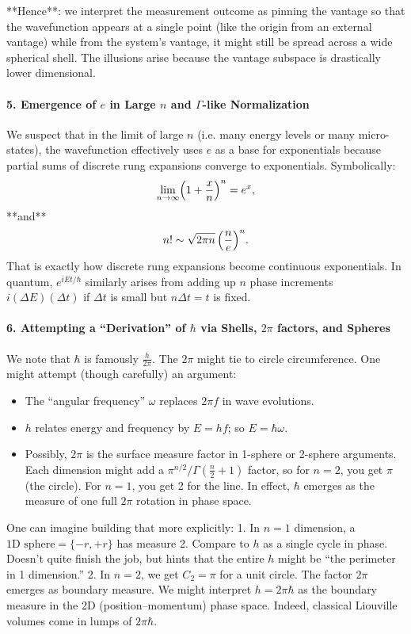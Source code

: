 \documentclass{article}
\begin{document}
**Hence**: we interpret the measurement outcome as pinning the vantage so that the wavefunction appears at a single point (like the origin from an external vantage) while from the system’s vantage, it might still be spread across a wide spherical shell. The illusions arise because the vantage subspace is drastically lower dimensional.

\paragraph{5. Emergence of $e$ in Large $n$ and $\Gamma$-like Normalization}

We suspect that in the limit of large $n$ (i.e. many energy levels or many micro-states), the wavefunction effectively uses $e$ as a base for exponentials because partial sums of discrete rung expansions converge to exponentials. Symbolically:
\begin{equation}
\lim_{n\to\infty} \Bigl(1+\frac{x}{n}\Bigr)^n = e^x,
\end{equation}
**and**
\begin{equation}
 n! \sim \sqrt{2\pi n}\,\Bigl(\frac{n}{e}\Bigr)^n.
\end{equation}
That is exactly how discrete rung expansions become continuous exponentials. In quantum, $e^{iEt/\hbar}$ similarly arises from adding up $n$ phase increments $i(\Delta E)(\Delta t)$ if $\Delta t$ is small but $n\Delta t = t$ is fixed.

\paragraph{6. Attempting a “Derivation” of $\hbar$ via Shells, $2\pi$ factors, and Spheres}

We note that $\hbar$ is famously $\frac{h}{2\pi}$. The $2\pi$ might tie to circle circumference. One might attempt (though carefully) an argument:
\begin{itemize}
\item The “angular frequency” $\omega$ replaces $2\pi f$ in wave evolutions.
\item $h$ relates energy and frequency by $E=h f$; so $E=\hbar\omega.$
\item Possibly, $2\pi$ is the surface measure factor in 1-sphere or 2-sphere arguments. Each dimension might add a $\pi^{n/2}/\Gamma(\tfrac{n}{2}+1)$ factor, so for $n=2$, you get $\pi$ (the circle). For $n=1$, you get 2 for the line. In effect, $\hbar$ emerges as the measure of one full $2\pi$ rotation in phase space.
\end{itemize}
One can imagine building that more explicitly:
1. In $n=1$ dimension, a $\text{1D sphere}=\{-r,+r\}$ has measure 2. Compare to $h$ as a single cycle in phase. Doesn’t quite finish the job, but hints that the entire $h$ might be “the perimeter in 1 dimension.”
2. In $n=2$, we get $C_2=\pi$ for a unit circle. The factor $2\pi$ emerges as boundary measure. We might interpret $h=2\pi\hbar$ as the boundary measure in the 2D (position–momentum) phase space. Indeed, classical Liouville volumes come in lumps of $2\pi\hbar$.
\end{document}
